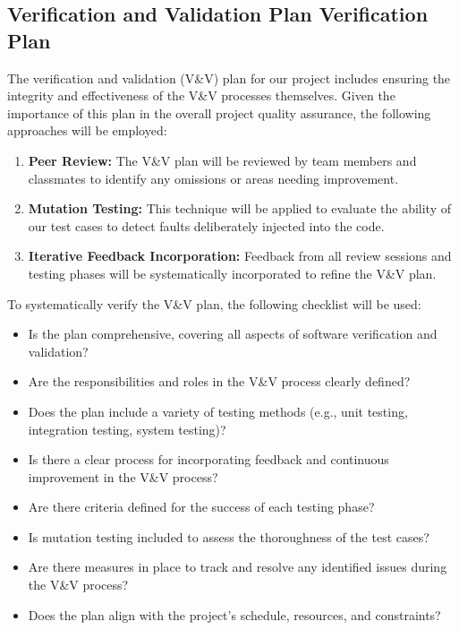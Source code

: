 \documentclass[12pt, titlepage]{article}
\begin{document}
\subsection{Verification and Validation Plan Verification Plan}

The verification and validation (V\&V) plan for our project includes ensuring the integrity and effectiveness of the V\&V processes themselves. Given the importance of this plan in the overall project quality assurance, the following approaches will be employed:

\begin{enumerate}
    \item \textbf{Peer Review:} The V\&V plan will be reviewed by team members and classmates to identify any omissions or areas needing improvement.
    \item \textbf{Mutation Testing:} This technique will be applied to evaluate the ability of our test cases to detect faults deliberately injected into the code.
    \item \textbf{Iterative Feedback Incorporation:} Feedback from all review sessions and testing phases will be systematically incorporated to refine the V\&V plan.
\end{enumerate}

To systematically verify the V\&V plan, the following checklist will be used:

\begin{itemize}
    \item Is the plan comprehensive, covering all aspects of software verification and validation?
    \item Are the responsibilities and roles in the V\&V process clearly defined?
    \item Does the plan include a variety of testing methods (e.g., unit testing, integration testing, system testing)?
    \item Is there a clear process for incorporating feedback and continuous improvement in the V\&V process?
    \item Are there criteria defined for the success of each testing phase?
    \item Is mutation testing included to assess the thoroughness of the test cases?
    \item Are there measures in place to track and resolve any identified issues during the V\&V process?
    \item Does the plan align with the project's schedule, resources, and constraints?
\end{itemize}
\end{document}

